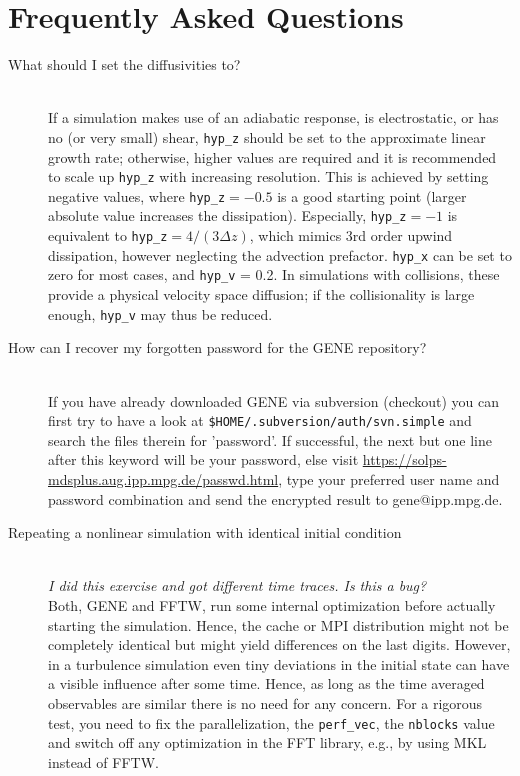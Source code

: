 \newpage
\section{Frequently Asked Questions}

\begin{description}
\item[\hypertarget{hyp-advice}{What should I set the diffusivities to?}]\hspace*{1em}\\
If a simulation makes use of an adiabatic response, is electrostatic, or has no (or very small) shear,
\texttt{hyp\_z} should be set to the approximate linear growth rate; 
otherwise, higher values are required and it is recommended to scale up \texttt{hyp\_z} with increasing resolution.
This is achieved by setting negative values, where
\texttt{hyp\_z}$=-0.5$ is a good starting point (larger absolute value increases the dissipation).
Especially, \texttt{hyp\_z}$=-1$ is equivalent to \texttt{hyp\_z}$=4/(3\Delta z)$, 
which mimics 3rd order upwind dissipation, however neglecting the advection prefactor. 
\texttt{hyp\_x} can be set to zero for most cases, and \texttt{hyp\_v} = 0.2.
In simulations with collisions, these provide a physical velocity space diffusion;
if the collisionality is large enough, \texttt{hyp\_v} may thus be reduced.

\item[How can I recover my forgotten password for the GENE repository?]\hspace*{1em}\\ 
If you have already downloaded GENE via subversion (checkout) you can first try to have a look at 
\verb|$HOME/.subversion/auth/svn.simple| 
and search the files therein for 'password'. 
If successful, the next but one line after this keyword will be your password, else visit 
\url{https://solps-mdsplus.aug.ipp.mpg.de/passwd.html}, type your preferred user name and password combination and send the encrypted result to gene@ipp.mpg.de. 

\item[Repeating a nonlinear simulation with identical initial condition]\hspace*{1em}\\
{\em I did this exercise and got different time traces. Is this a bug?}\hspace*{1em}\\
Both, GENE and FFTW, run some internal optimization before actually starting the simulation. Hence, the cache or MPI distribution might not be completely identical but might yield differences on the last digits. However, in a turbulence simulation even tiny deviations in the initial state can have a visible influence after some time. Hence, as long as the time averaged observables are similar there is no need for any concern. For a rigorous test, you need to fix the parallelization, the \texttt{perf\_vec}, the \texttt{nblocks} value and switch off any optimization in the FFT library, e.g., by using MKL instead of FFTW.

\end{description}


